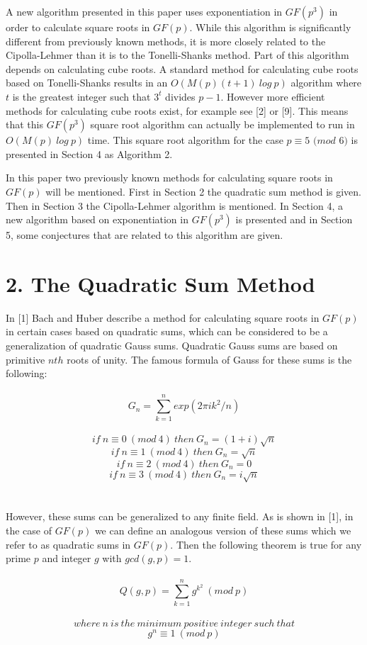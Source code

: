 \documentclass[final,letterpaper,oneside,10pt]{article}
\begin{document}
A new algorithm presented in this paper uses exponentiation in $GF(p^3)$ in order to calculate square roots in $GF(p)$.
While this algorithm is significantly different from previously known methods, it is more closely related to the Cipolla-Lehmer than
it is to the Tonelli-Shanks method.  Part of this algorithm depends on calculating cube roots.  A standard method for calculating 
cube roots based on Tonelli-Shanks  results in an  $O(M(p)(t+1)~log~p)$ algorithm where $t$ is the greatest
integer such that $3^t$ divides $p-1$.  However more efficient methods for calculating cube roots exist, for example 
see [2] or [9].  This means that this $GF(p^3)$ square root algorithm can actually be implemented to run in $O(M(p)~log~p)$ time.
This square root algorithm for the case $p \equiv 5$ $(mod$ $6)$ is presented in Section 4 as Algorithm 2.

In this paper two previously known methods for calculating square roots in $GF(p)$ will be mentioned.  First in Section 2 the 
quadratic sum method is given.  Then in Section 3 the Cipolla-Lehmer algorithm is mentioned.  In Section 4, a new algorithm
based on exponentiation in $GF(p^3)$ is presented and  in Section 5, some conjectures that are related to this algorithm are given.
\\


\section*{2. The Quadratic Sum Method}
In [1] Bach and Huber describe a method for calculating square roots in $GF(p)$ in certain cases based on quadratic sums, which can be
considered to be a generalization of quadratic Gauss sums.  Quadratic Gauss sums are based on primitive $nth$ roots of unity.
The famous formula of Gauss for these sums is the following:
\\
\\
\[G_n = \sum_{k=1}^n exp(2 \pi ik^2/n)\]
\\
\[if~ n\equiv0~(mod~4)~then~G_n = (1+i)\sqrt{n}\]
\[if~ n\equiv1~(mod~4)~then~G_n = \sqrt{n}\]
\[if~ n\equiv2~(mod~4)~then~G_n = 0\]
\[if~ n\equiv3~(mod~4)~then~G_n = i\sqrt{n}\]
\\
\\
However, these sums can be generalized to any finite field.  As is shown in [1], in the case of $GF(p)$ we can define an analogous 
version of these sums which we refer to as quadratic sums in $GF(p)$.  Then the following theorem is true for any prime $p$
and integer $g$ with $gcd(g,p)=1$.
\\
\\
\[Q(g,p) = \sum_{k=1}^n g^{k^2}~(mod~ p)\]
\\
\[where~n~is~ the ~minimum ~positive~ integer~ such~ that\]
\[g^n\equiv1~(mod~p)\]
\end{document}
